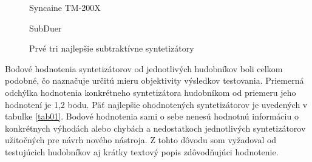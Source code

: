 \begin{figure}[h]%
\centering
\begin{minipage}[h]{7cm}
\centering
{}
Syncaine TM-200X
\end{minipage}
\quad
\begin{minipage}[h]{7cm}
\centering
{}
SubDuer
\end{minipage}
\vspace{5 mm}
\caption{Prvé tri najlepšie subtraktívne syntetizátory}
\label{obr05}
\end{figure}%
\vspace{5 mm}
\noindent
Bodové hodnotenia syntetizátorov od jednotlivých hudobníkov boli celkom podobné, čo naznačuje určitú mieru objektivity výsledkov testovania. Priemerná odchýlka hodnotenia konkrétneho syntetizátora hudobníkom od priemeru jeho hodnotení je 1,2 bodu. Päť najlepšie ohodnotených syntetizátorov je uvedených v tabuľke \ref{tab01}. Bodové hodnotenia sami o sebe nenesú hodnotnú informáciu o konkrétnych výhodách alebo chybách a nedostatkoch jednotlivých syntetizátorov užitočných pre návrh nového nástroja. Z tohto dôvodu som vyžadoval od testujúcich hudobníkov aj krátky textový popis zdôvodňujúci hodnotenie. 

